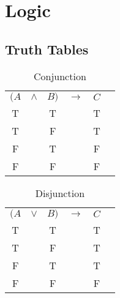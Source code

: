 \section{Logic}


\subsection{Truth Tables}\label{subsec-truth-table}


\begin{table}[hbt!]
    \centering
    \begin{tabular}{*{6}{c}}
        $(A$ & $\land$ & $B)$ & $\rightarrow$ & $C$ \\
           T &         & T    &               & T   \\
           T &         & F    &               & T   \\
           F &         & T    &               & F   \\
           F &         & F    &               & F   \\
    \end{tabular}
    \caption{Conjunction}\label{table-conjunction}
\end{table}

\begin{table}[hbt!]
    \centering
    \begin{tabular}{*{6}{c}}
        $(A$ & $\lor$ & $B)$ & $\rightarrow$ & $C$ \\
           T &        & T    &               & T   \\
           T &        & F    &               & T   \\
           F &        & T    &               & T   \\
           F &        & F    &               & F   \\
    \end{tabular}
    \caption{Disjunction}\label{table-disjunction}
\end{table}

